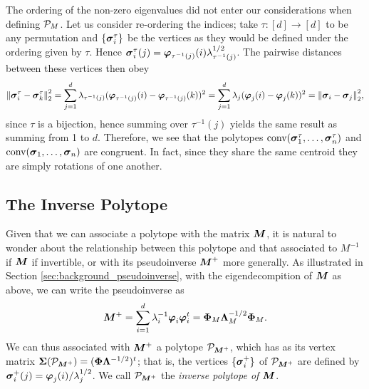\begin{remark}
	The ordering of the non-zero eigenvalues did not enter our considerations when defining $\P_M$. Let us consider re-ordering the indices; take $\tau:[d]\to[d]$ to be any permutation and $\{\sv_i^\tau\}$ be the vertices as they would be defined under the ordering given by $\tau$. Hence $\sv_i^\tau(j) = \vp_{\tau^{-1}(j)}(i)\lambda_{\tau^{-1}(j)}^{1/2}$. The pairwise distances between these vertices then obey 
	\begin{equation*}
	\norm{\sv_i^\tau-\sv_k^\tau}_2^2 = \sum_{j=1}^d \lambda_{\tau^{-1}(j)} (\vp_{\tau^{-1}(j)}(i)-\vp_{\tau^{-1}(j)}(k))^2 = \sum_{j=1}^d \lambda_{j} (\vp_{j}(i)-\vp_{j}(k))^2 = \norm{\sv_i-\sv_j}_2^2,
	\end{equation*}
	since $\tau$ is a bijection, hence summing over $\tau^{-1}(j)$ yields the same result as summing from 1 to $d$. 
	Therefore, we see that the polytopes $\conv(\sv_1^\tau,\dots,\sv_n^\tau)$ and  $\conv(\sv_1,\dots,\sv_n)$ are congruent. In fact, since they share the same centroid they are simply rotations of one another. 
\end{remark}


\subsection{The Inverse Polytope} 
\label{sec:inverse_polytope}
Given that we can associate a polytope with the matrix $\M$, it is natural to wonder about the relationship between this polytope and that associated to $M^{-1}$ if $\M$ if invertible, or with its pseudoinverse $\M^+$ more generally. As illustrated in Section \ref{sec:background_pseudoinverse}, with the eigendecompition of $\M$ as above, we can write  the pseudoinverse as 
\[\M^+=\sum_{i=1}^d \lambda_i^{-1} \eig_i\eig_i^\tp = \Eig_M \Eval_M^{-1/2}\Eig_M.\]
We can thus associated with $\M^+$ a polytope $\pol_{\M^+}$, which has as its vertex matrix $\Sv(\pol_{\M^+})=(\Eig\Eval^{-1/2})^\tp$; that is, the vertices $\{\sv_i^+\}$ of $\pol_{\M^+}$ are defined by 
$\sv_i^+(j)=\eig_j(i)/\lambda_j^{1/2}$. We call $\pol_{\M^+}$ the \emph{inverse polytope of $\M$}. 

